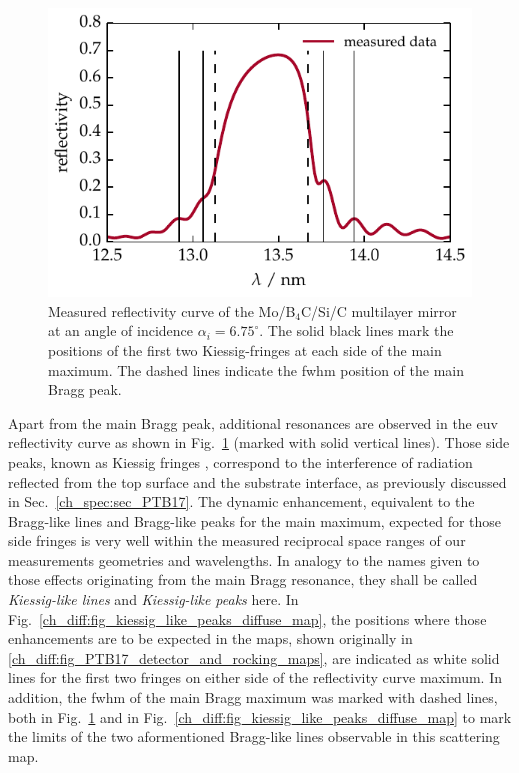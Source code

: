 \begin{figure}[htbp]
        \includegraphics{img/kiessig_like_peaks_reflectivity_curve} \caption{Measured reflectivity curve of the Mo/B$_4$C/Si/C multilayer mirror at an angle of incidence $\alpha_i = 6.75^\circ$. The solid black lines mark the positions of the first two Kiessig-fringes at each side of the main maximum. The dashed lines indicate the \gls{fwhm} position of the main Bragg peak.}
        \label{ch_diff:fig_ptb17_reflectance_AOI_675} 
\end{figure}
Apart from the main Bragg peak, additional resonances are observed in the \gls{euv} reflectivity curve as shown in Fig.~\ref{ch_diff:fig_ptb17_reflectance_AOI_675} (marked with solid vertical lines). Those side peaks, known as Kiessig fringes \cite{kiessig_interferenz_1931}, correspond to the interference of radiation reflected from the top surface and the substrate interface, as previously discussed in Sec.~\ref{ch_spec:sec_PTB17}. The dynamic enhancement, equivalent to the Bragg-like lines and Bragg-like peaks for the main maximum, expected for those side fringes is very well within the measured reciprocal space ranges of our measurements geometries and wavelengths. In analogy to the names given to those effects originating from the main Bragg resonance, they shall be called \emph{Kiessig-like lines} and \emph{Kiessig-like peaks} here. In Fig.~\ref{ch_diff:fig_kiessig_like_peaks_diffuse_map}, the positions where those enhancements are to be expected in the maps, shown originally in \ref{ch_diff:fig_PTB17_detector_and_rocking_maps}, are indicated as white solid lines for the first two fringes on either side of the reflectivity curve maximum. In addition, the \gls{fwhm} of the main Bragg maximum was marked with dashed lines, both in Fig.~\ref{ch_diff:fig_ptb17_reflectance_AOI_675} and in Fig.~\ref{ch_diff:fig_kiessig_like_peaks_diffuse_map} to mark the limits of the two aformentioned Bragg-like lines observable in this scattering map.
